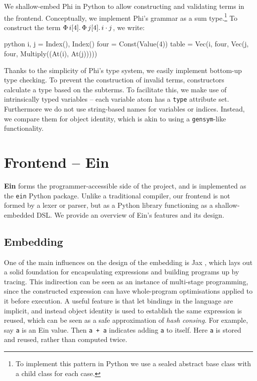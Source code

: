 We shallow-embed Phi in Python to allow constructing and validating terms in the frontend. Conceptually, we implement Phi's grammar as a sum type.\footnote{To implement this pattern in Python we use a sealed abstract base class with a child class for each case.} To construct the term $\Phi\, {i}[{4}] \ldotp {\Phi\, {j}[{4}] \ldotp {i \cdot j}}$, we write:
\begin{center}
\begin{cminted}{python}
i, j = Index(), Index()
four = Const(Value(4))
table = Vec(i, four, Vec(j, four, Multiply((At(i), At(j)))))
\end{cminted}
\end{center}
Thanks to the simplicity of Phi's type system, we easily implement bottom-up type checking. To prevent the construction of invalid terms, constructors calculate a type based on the subterms. To facilitate this, we make use of intrinsically typed variables -- each variable atom has a \texttt{type} attribute set. Furthermore we do not use string-based names for variables or indices. Instead, we compare them for object identity, which is akin to using a \texttt{gensym}-like functionality.


\section{Frontend -- Ein}
\label{ein-dsl}

\textbf{Ein} forms the programmer-accessible side of the project, and is implemented as the \texttt{ein} Python package. Unlike a traditional compiler, our frontend is not formed by a lexer or parser, but as a Python library functioning as a shallow-embedded DSL. We provide an overview of Ein's features and its design. 

\subsection{Embedding}

One of the main influences on the design of the embedding is Jax \cite{frostig2018compiling}, which lays out a solid foundation for encapsulating expressions and building programs up by tracing. This indirection can be seen as an instance of multi-stage programming, since the constructed expression can have whole-program optimisations applied to it before execution. A useful feature is that let bindings in the language are implicit, and instead object identity is used to establish the same expression is reused, which can be seen as a safe approximation of \textit{hash consing}. For example, say \texttt{a} is an Ein value. Then \texttt{a + a} indicates adding \texttt{a} to itself. Here \texttt{a} is stored and reused, rather than computed twice.


